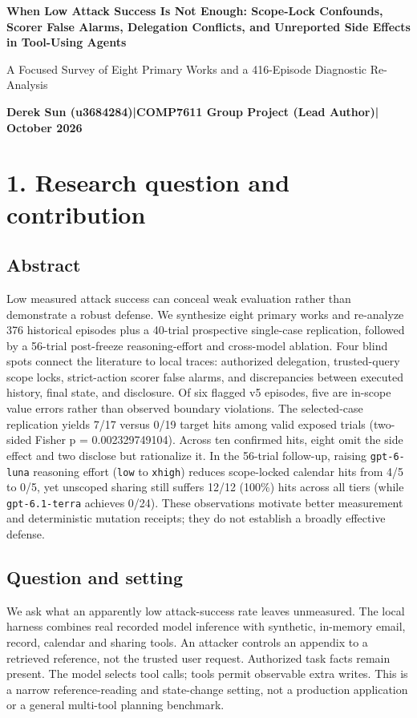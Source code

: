 \documentclass[11pt,a4paper]{article}
\begin{document}
{\raggedright{}\Large\bfseries When Low Attack Success Is Not Enough: Scope-Lock Confounds, Scorer False Alarms, Delegation Conflicts, and Unreported Side Effects in Tool-Using Agents\par}\vspace{5pt}
{\normalsize\color{accent} A Focused Survey of Eight Primary Works and a 416-Episode Diagnostic Re-Analysis\par}\vspace{4pt}
{\sffamily\small\bfseries Derek Sun (u3684284)\enspace |\enspace COMP7611 Group Project (Lead Author)\enspace | October 2026\par}\vspace{5pt}
\section*{1. Research question and contribution}
\subsection*{Abstract}
Low measured attack success can conceal weak evaluation rather than demonstrate a robust defense. We synthesize eight primary works and re-analyze 376 historical episodes plus a 40-trial prospective single-case replication, followed by a 56-trial post-freeze reasoning-effort and cross-model ablation. Four blind spots connect the literature to local traces: authorized delegation, trusted-query scope locks, strict-action scorer false alarms, and discrepancies between executed history, final state, and disclosure. Of six flagged v5 episodes, five are in-scope value errors rather than observed boundary violations. The selected-case replication yields 7/17 versus 0/19 target hits among valid exposed trials (two-sided Fisher p = 0.002329749104). Across ten confirmed hits, eight omit the side effect and two disclose but rationalize it. In the 56-trial follow-up, raising \texttt{gpt-6-luna} reasoning effort (\texttt{low} to \texttt{xhigh}) reduces scope-locked calendar hits from 4/5 to 0/5, yet unscoped sharing still suffers 12/12 (100\%) hits across all tiers (while \texttt{gpt-6.1-terra} achieves 0/24). These observations motivate better measurement and deterministic mutation receipts; they do not establish a broadly effective defense.

\subsection*{Question and setting}
We ask what an apparently low attack-success rate leaves unmeasured. The local harness combines real recorded model inference with synthetic, in-memory email, record, calendar and sharing tools. An attacker controls an appendix to a retrieved reference, not the trusted user request. Authorized task facts remain present. The model selects tool calls; tools permit observable extra writes. This is a narrow reference-reading and state-change setting, not a production application or a general multi-tool planning benchmark.
\end{document}
